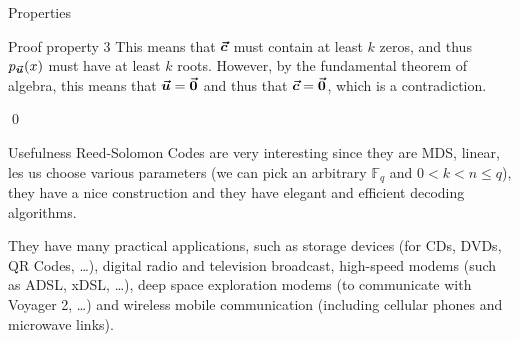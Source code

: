 \documentclass[a4paper]{article}
\begin{document}
\begin{parag}{Properties}
\begin{subparag}{Proof property 3}
        This means that $\bm{\protect\vec{c}}$ must contain at least $k$ zeros, and thus $p_{\bvec{u}}\left(x\right)$ must have at least $k$ roots. However, by the fundamental theorem of algebra, this means that $\bm{\protect\vec{u}} = \bm{\protect\vec{0}}$ and thus that $\bm{\protect\vec{c}} = \bm{\protect\vec{0}}$, which is a contradiction.

        \qed
    \end{subparag}
\end{parag}

\begin{parag}{Usefulness}
    Reed-Solomon Codes are very interesting since they are MDS, linear, les us choose various parameters (we can pick an arbitrary $\mathbb{F}_q$ and $0 < k < n \leq q$), they have a nice construction and they have elegant and efficient decoding algorithms. 

    They have many practical applications, such as storage devices (for CDs, DVDs, QR Codes, \ldots), digital radio and television broadcast, high-speed modems (such as ADSL, xDSL, \ldots), deep space exploration modems (to communicate with Voyager 2, \ldots) and wireless mobile communication (including cellular phones and microwave links).
\end{parag}
\end{document}
